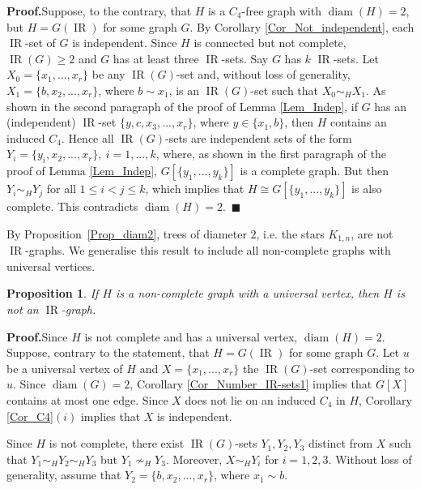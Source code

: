 \documentclass[12pt]{article}%
\newtheorem{proposition}[theorem]{Proposition}
\begin{document}
\noindent\textbf{Proof.\hspace{0.1in}}Suppose, to the contrary, that $H$ is a
$C_{4}$-free graph with $\operatorname{diam}(H)=2$, but $H=G(\operatorname{IR}%
)$ for some graph $G$. By Corollary \ref{Cor_Not_independent}, each
$\operatorname{IR}$-set of $G$ is independent. Since $H$ is connected but not
complete, $\operatorname{IR}(G)\geq2$ and $G$ has at least three
$\operatorname{IR}$-sets. Say $G$ has $k$ $\operatorname{IR}$-sets. Let
$X_{0}=\{x_{1},...,x_{r}\}$ be any $\operatorname{IR}(G)$-set and, without
loss of generality, $X_{1}=\{b,x_{2},...,x_{r}\}$, where $b\sim x_{1}$, is an
$\operatorname{IR}(G)$-set such that $X_{0}\sim_{H}X_{1}$. As shown in the
second paragraph of the proof of Lemma \ref{Lem_Indep}, if $G$ has an
(independent) $\operatorname{IR}$-set $\{y,c,x_{3},...,x_{r}\}$, where
$y\in\{x_{1},b\}$, then $H$ contains an induced $C_{4}$. Hence all
$\operatorname{IR}(G)$-sets are independent sets of the form $Y_{i}%
=\{y_{i},x_{2},...,x_{r}\},\ i=1,...,k$, where, as shown in the first
paragraph of the proof of Lemma \ref{Lem_Indep}, $G[\{y_{1},...,y_{k}\}]$ is a
complete graph. But then $Y_{i}\sim_{H}Y_{j}$ for all $1\leq i<j\leq k$, which
implies that $H\cong G[\{y_{1},...,y_{k}\}]$ is also complete. This
contradicts $\operatorname{diam}(H)=2$.~$\blacksquare$

\bigskip

By Proposition~\ref{Prop_diam2}, trees of diameter $2$, i.e. the stars
$K_{1,n}$, are not $\operatorname{IR}$-graphs. We generalise this result to
include all non-complete graphs with universal vertices.

\begin{proposition}
\label{Prop_K1_n}If $H$ is a non-complete graph with a universal vertex, then
$H$ is not an $\operatorname{IR}$-graph.
\end{proposition}

\noindent\textbf{Proof.\hspace{0.1in}}Since $H$ is not complete and has a
universal vertex, $\operatorname{diam}(H)=2$. Suppose, contrary to the
statement, that $H=G(\operatorname{IR})$ for some graph $G$. Let $u$ be a
universal vertex of $H$ and $X=\{x_{1},...,x_{r}\}$ the $\operatorname{IR}%
(G)$-set corresponding to $u$. Since $\operatorname{diam}(G)=2$, Corollary
\ref{Cor_Number_IR-sets1} implies that $G[X]$ contains at most one edge. Since
$X$ does not lie on an induced $C_{4}$ in $H$, Corollary \ref{Cor_C4}$(i)$
implies that $X$ is independent.

Since $H$ is not complete, there exist $\operatorname{IR}(G)$-sets
$Y_{1},Y_{2},Y_{3}$ distinct from $X$ such that $Y_{1}\sim_{H}Y_{2}\sim
_{H}Y_{3}$ but $Y_{1}\nsim_{H}Y_{3}$. Moreover, $X\sim_{H}Y_{i}$ for
$i=1,2,3$. Without loss of generality, assume that $Y_{2}=\{b,x_{2}%
,...,x_{r}\}$, where $x_{1}\sim b$.
\end{document}
